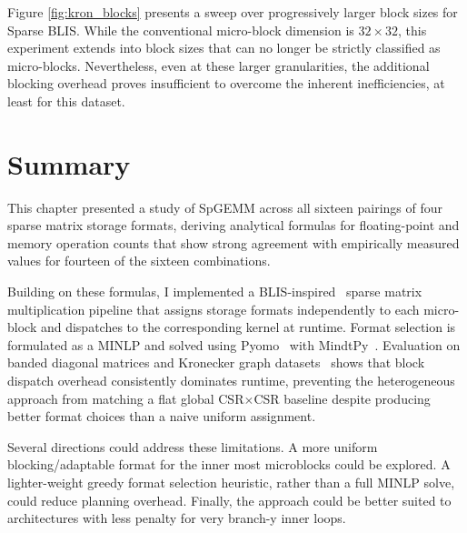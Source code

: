 Figure \ref{fig:kron_blocks} presents a sweep over progressively larger block sizes for Sparse BLIS. While the conventional micro-block dimension is $32\times32$, this experiment extends into block sizes that can no longer be strictly classified as micro-blocks. Nevertheless, even at these larger granularities, the additional blocking overhead proves insufficient to overcome the inherent inefficiencies, at least for this dataset.

\section{Summary}

This chapter presented a study of SpGEMM across all sixteen pairings of four sparse matrix
storage formats, deriving analytical formulas for floating-point and memory operation
counts that show strong agreement with empirically measured values for fourteen of the
sixteen combinations.

Building on these formulas, I implemented a BLIS-inspired~\cite{blis} sparse matrix
multiplication pipeline that assigns storage formats independently to each micro-block
and dispatches to the corresponding kernel at runtime. Format selection is formulated
as a MINLP and solved using Pyomo~\cite{pyomo} with MindtPy~\cite{mindtpy}. Evaluation
on banded diagonal matrices and Kronecker graph datasets~\cite{kronecker} shows that
block dispatch overhead consistently dominates runtime, preventing the heterogeneous
approach from matching a flat global CSR$\times$CSR baseline despite producing better
format choices than a naive uniform assignment.

Several directions could address these limitations. A more uniform blocking/adaptable
format for the inner most microblocks could be explored. A lighter-weight greedy format
selection heuristic, rather than a full MINLP solve, could reduce planning overhead.
Finally, the approach could be better suited to architectures with less penalty for very
branch-y inner loops.
